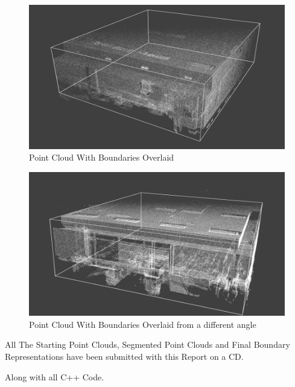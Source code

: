 \begin{figure}[H]
\centering
\includegraphics[width=1\linewidth]{Includes/images/Appendix/bound1}
\caption{Point Cloud With Boundaries Overlaid}
\label{fig:bound1}
\end{figure}
\begin{figure}[H]
\centering
\includegraphics[width=1\linewidth]{Includes/images/Appendix/bound2}
\caption{Point Cloud With Boundaries Overlaid from a different angle}
\label{fig:bound2}
\end{figure}

All The Starting Point Clouds, Segmented Point Clouds and Final Boundary Representations have been submitted with this Report on a CD.

Along with all C++ Code.


